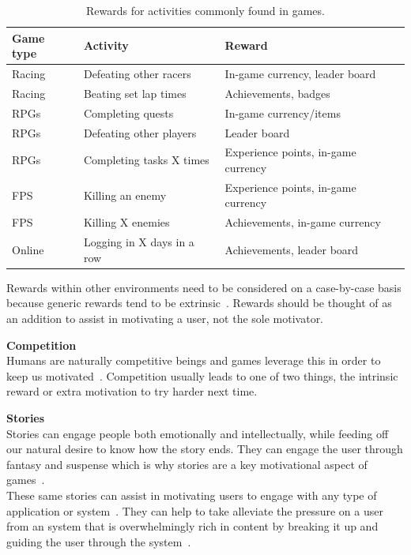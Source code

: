 \documentclass[a4paper,12pt]{article}
\begin{document}
\begin{table}[!ht]
	\begin{tabular}{|l|l|l|}\hline
		\textbf{Game type} & 	\textbf{Activity} & \textbf{Reward} \\\hline
		Racing 	&	Defeating other racers 	& In-game currency, leader board\\
		Racing	&	Beating set lap times	& Achievements, badges\\
		RPGs 	&  	Completing quests & In-game currency/items\\
		RPGs 	&	Defeating other players & Leader board\\
		RPGs 	& 	Completing tasks X times & Experience points, in-game currency\\
		FPS 	&	Killing an enemy	& Experience points, in-game currency\\
		FPS 	&	Killing X enemies	& Achievements, in-game currency\\
		Online 	&	Logging in X days in a row & Achievements, leader board\\\hline
	\end{tabular}
	\caption{Rewards for activities commonly found in games.}
	\label{table:game-rewards}
\end{table}

Rewards within other environments need to be considered on a case-by-case basis because generic rewards tend to be extrinsic~\citep{deci_extrinsic_2001}. Rewards should be thought of as an addition to assist in motivating a user, not the sole motivator.

\par
\textbf{Competition}\\
Humans are naturally competitive beings and games leverage this in order to keep us motivated~\citep{bread-and-games}. 
Competition usually leads to one of two things, the intrinsic reward or extra motivation to try harder next time.

\par
\textbf{Stories}\\
Stories can engage people both emotionally and intellectually, while feeding off our natural desire to know how the story ends.
They can engage the user through fantasy and suspense which is why stories are a key motivational aspect of games~\citep{Narrative-Centered-Learning-Environments}.\\
These same stories can assist in motivating users to engage with any type of application or system~\citep{applications-as-stories}. 
They can help to take alleviate the pressure on a user from an system that is overwhelmingly rich in content by breaking it up and guiding the user through the system~\citep{applications-as-stories,brown_human-computer_1998,lidwell_universal_2010}.
\end{document}
